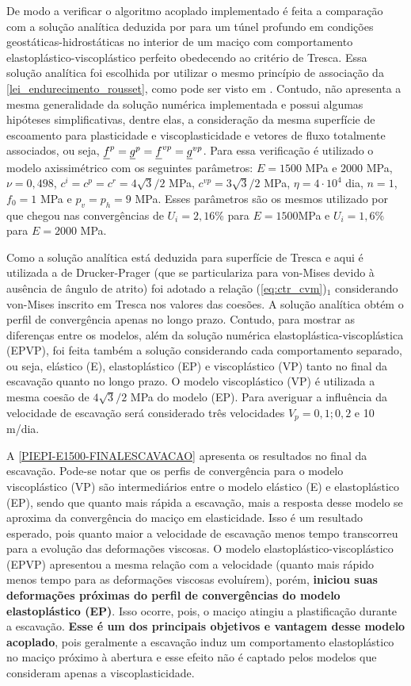 De modo a verificar o algoritmo acoplado implementado é feita a comparação com a solução analítica deduzida por  para um túnel profundo em condições geostáticas-hidrostáticas no interior de um maciço com comportamento elastoplástico-viscoplástico perfeito obedecendo ao critério de Tresca. Essa solução analítica foi escolhida por utilizar o mesmo princípio de associação da \autoref{lei_endurecimento_rousset}, como pode ser visto em . Contudo, não apresenta a mesma generalidade da solução numérica implementada e possui algumas hipóteses simplificativas, dentre elas, a consideração da mesma superfície de escoamento para plasticidade e viscoplasticidade e vetores de fluxo totalmente associados, ou seja, $\underline f^p = \underline{g}^{p} = \underline f^{vp} = \underline{g}^{vp}$. Para essa verificação é utilizado o modelo axissimétrico com os seguintes parâmetros: $E=1500$ MPa e $2000$ MPa, $\nu=0,498$, $c^i=c^p=c^r =4\sqrt{3}/2$ MPa, $c^{vp}=3\sqrt{3}/2$ MPa, $\eta = 4 \cdot 10^4$ dia, $n=1$, $f_0=1$ MPa e $p_v=p_h=9$ MPa. Esses parâmetros são os mesmos utilizado por  que chegou nas convergências de $U_i=2,16$\% para $E=1500$MPa e $U_i=1,6$\% para $E=2000$ MPa.

Como a solução analítica está deduzida para superfície de Tresca e aqui é utilizada a de Drucker-Prager (que se particulariza para von-Mises devido à ausência de ângulo de atrito) foi adotado a relação (\ref{eq:ctr_cvm})$_1$ considerando von-Mises inscrito em Tresca nos valores das coesões. A solução analítica obtém o perfil de convergência apenas no longo prazo. Contudo, para mostrar as diferenças entre os modelos, além da solução numérica elastoplástica-viscoplástica (EPVP), foi feita também a solução considerando cada comportamento separado, ou seja, elástico (E), elastoplástico (EP) e viscoplástico (VP) tanto no final da escavação quanto no longo prazo. O modelo viscoplástico (VP) é utilizada a mesma coesão de $4\sqrt{3}/2$ MPa do modelo (EP). Para averiguar a influência da velocidade de escavação será considerado três velocidades $V_p=0,1; 0,2$ e 10 m/dia.

A \autoref{PIEPI-E1500-FINALESCAVACAO} apresenta os resultados no final da escavação. Pode-se notar que os perfis de convergência para o modelo viscoplástico (VP) são intermediários entre o modelo elástico (E) e elastoplástico (EP), sendo que quanto mais rápida a escavação, mais a resposta desse modelo se  aproxima da convergência do maciço em elasticidade. Isso é um resultado esperado, pois quanto maior a velocidade de escavação menos tempo transcorreu para a evolução das deformações viscosas. O modelo elastoplástico-viscoplástico (EPVP) apresentou a mesma relação com a velocidade (quanto mais rápido menos tempo para as deformações viscosas evoluírem), porém, \textbf{iniciou suas deformações próximas do perfil de convergências do modelo elastoplástico (EP)}. Isso ocorre, pois, o maciço atingiu a plastificação durante a escavação. \textbf{Esse é um dos principais objetivos e vantagem desse modelo acoplado}, pois geralmente a escavação induz um comportamento elastoplástico no maciço próximo à abertura e esse efeito não é captado pelos modelos que consideram apenas a viscoplasticidade.

